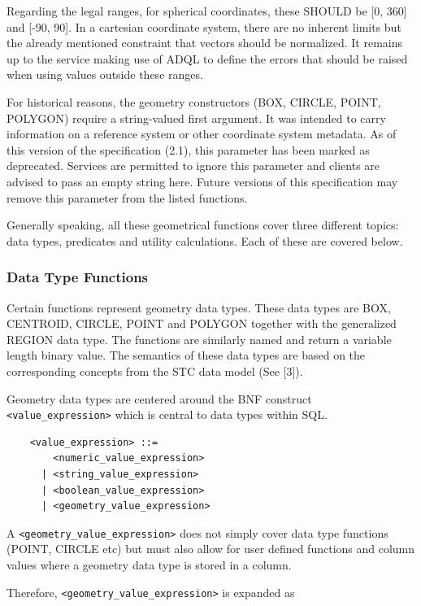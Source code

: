 \documentclass[11pt,a4paper]{ivoa}
\begin{document}
Regarding the legal ranges, for spherical coordinates, these SHOULD be [0, 360]
and [-90, 90]. In a cartesian coordinate system, there are no inherent limits
but the already mentioned constraint that vectors should be normalized. It remains
up to the service making use of ADQL to define the errors that should be raised
when using values outside these ranges.

For historical reasons, the geometry constructors (BOX, CIRCLE, POINT,
POLYGON) require a string-valued first argument. It was intended to carry
information on a reference system or other coordinate system metadata.
As of this version of the specification (2.1), this parameter has been
marked as deprecated. Services are permitted to ignore this parameter and
clients are advised to pass an empty string here. Future versions of this
specification may remove this parameter from the listed functions.

Generally speaking, all these geometrical functions cover three different
topics: data types, predicates and utility calculations. Each of these are
covered below.

\subsubsection{Data Type Functions}
\label{sec:geom.functions.type}

Certain functions represent geometry data types. These data types are BOX,
CENTROID, CIRCLE, POINT and POLYGON together with the generalized REGION data
type. The functions are similarly named and return a variable length binary
value. The semantics of these data types are based on the corresponding
concepts from the STC data model (See [3]).

Geometry data types are centered around the BNF construct
\verb:<value_expression>: which is central to data types within SQL.

\begin{verbatim}
    <value_expression> ::=
        <numeric_value_expression>
      | <string_value_expression>
      | <boolean_value_expression>
      | <geometry_value_expression>
\end{verbatim}

A \verb:<geometry_value_expression>: does not simply cover data type functions
(POINT, CIRCLE etc) but must also allow for user defined functions and
column values where a geometry data type is stored in a column.

Therefore, \verb:<geometry_value_expression>: is expanded as
\end{document}
